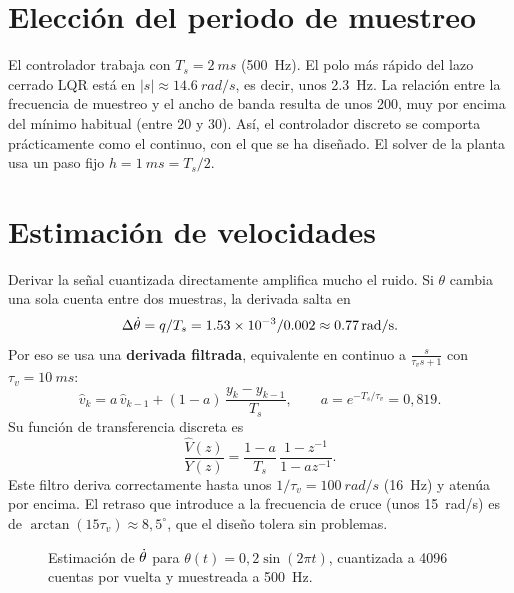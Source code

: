 \section{Elección del periodo de muestreo}

El controlador trabaja con $T_s=\SI{2}{ms}$ (\SI{500}{Hz}). El polo más rápido del lazo cerrado LQR está en $|s|\approx\SI{14.6}{rad/s}$, es decir, unos \SI{2.3}{Hz}. La relación entre la frecuencia de muestreo y el ancho de banda resulta de unos 200, muy por encima del mínimo habitual (entre 20 y 30). Así, el controlador discreto se comporta prácticamente como el continuo, con el que se ha diseñado. El solver de la planta usa un paso fijo $h=\SI{1}{ms}=T_s/2$.

\section{Estimación de velocidades}

Derivar la señal cuantizada directamente amplifica mucho el ruido. Si $\theta$ cambia una sola cuenta entre dos muestras, la derivada salta en
\begin{equation}
\Delta\dot{\theta} = q/T_s = \SI{1.53e-3}{}/\SI{0.002}{} \approx \SI{0.77}{rad/s} .
\end{equation}
Por eso se usa una \textbf{derivada filtrada}, equivalente en continuo a $\frac{s}{\tau_v s+1}$ con $\tau_v=\SI{10}{ms}$:
\begin{equation}
\hat v_k = a\,\hat v_{k-1} + (1-a)\,\frac{y_k-y_{k-1}}{T_s},\qquad a=e^{-T_s/\tau_v}=0{,}819.
\end{equation}
Su función de transferencia discreta es
\begin{equation}
\frac{\hat V(z)}{Y(z)} = \frac{1-a}{T_s}\,\frac{1-z^{-1}}{1-a z^{-1}} .
\end{equation}
Este filtro deriva correctamente hasta unos $1/\tau_v=\SI{100}{rad/s}$ (\SI{16}{Hz}) y atenúa por encima. El retraso que introduce a la frecuencia de cruce (unos \SI{15}{rad/s}) es de $\arctan(15\tau_v)\approx 8,5^\circ$, que el diseño tolera sin problemas.

\begin{figure}[H]
\centering
{}
\caption{Estimación de $\dot{\theta}$ para $\theta(t)=0{,}2\sin(2\pi t)$, cuantizada a 4096 cuentas por vuelta y muestreada a \SI{500}{Hz}.}
\label{fig:velest}
\end{figure}

